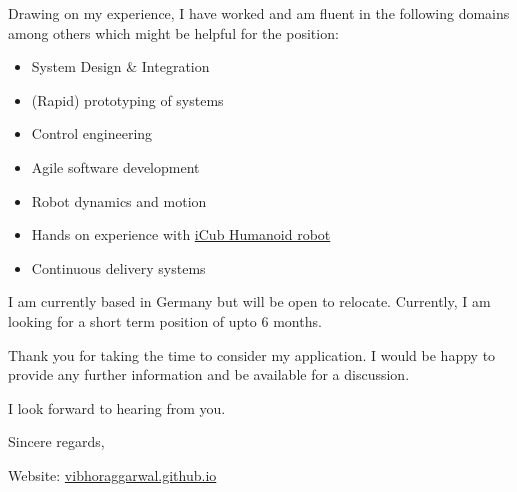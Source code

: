 \documentclass[a4paper,10 pt]{letter} %
\begin{document}
\begin{letter}
Drawing on my experience, I have worked and am fluent in the following domains among others which might be helpful for the position:
\begin{itemize}
  \item System Design \& Integration
  \item (Rapid) prototyping of systems
  \item Control engineering
  \item Agile software development
  \item Robot dynamics and motion
  \item Hands on experience with \href{https://icub.iit.it/}{iCub Humanoid robot}
  \item Continuous delivery systems
\end{itemize}

I am currently based in Germany but will be open to relocate. Currently, I am looking for a short term position of upto 6 months.

Thank you for taking the time to consider my application. I would be happy to provide any further information and be available for a discussion.

I look forward to hearing from you.

\closing{Sincere regards, \\

}

Website: \href{https://vibhoraggarwal.github.io/}{vibhoraggarwal.github.io}
\end{letter}
\end{document}

